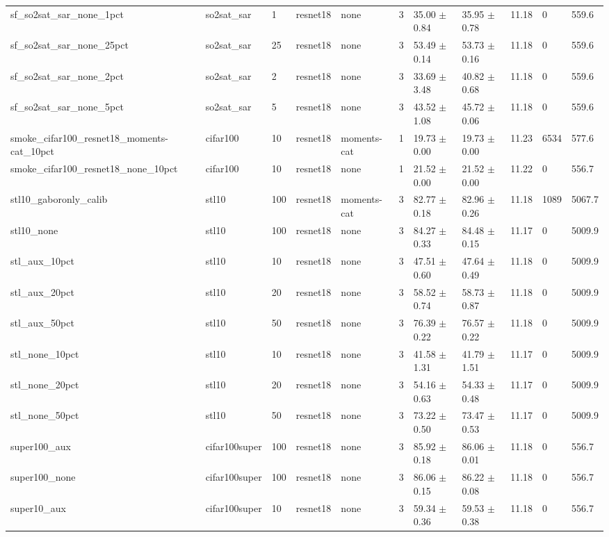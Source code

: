 \begin{tabular}{lllllllllll}
sf_so2sat_sar_none_1pct & so2sat_sar & 1 & resnet18 & none & 3 & 35.00 $\pm$ 0.84 & 35.95 $\pm$ 0.78 & 11.18 & 0 & 559.6 \\
sf_so2sat_sar_none_25pct & so2sat_sar & 25 & resnet18 & none & 3 & 53.49 $\pm$ 0.14 & 53.73 $\pm$ 0.16 & 11.18 & 0 & 559.6 \\
sf_so2sat_sar_none_2pct & so2sat_sar & 2 & resnet18 & none & 3 & 33.69 $\pm$ 3.48 & 40.82 $\pm$ 0.68 & 11.18 & 0 & 559.6 \\
sf_so2sat_sar_none_5pct & so2sat_sar & 5 & resnet18 & none & 3 & 43.52 $\pm$ 1.08 & 45.72 $\pm$ 0.06 & 11.18 & 0 & 559.6 \\
smoke_cifar100_resnet18_moments-cat_10pct & cifar100 & 10 & resnet18 & moments-cat & 1 & 19.73 $\pm$ 0.00 & 19.73 $\pm$ 0.00 & 11.23 & 6534 & 577.6 \\
smoke_cifar100_resnet18_none_10pct & cifar100 & 10 & resnet18 & none & 1 & 21.52 $\pm$ 0.00 & 21.52 $\pm$ 0.00 & 11.22 & 0 & 556.7 \\
stl10_gaboronly_calib & stl10 & 100 & resnet18 & moments-cat & 3 & 82.77 $\pm$ 0.18 & 82.96 $\pm$ 0.26 & 11.18 & 1089 & 5067.7 \\
stl10_none & stl10 & 100 & resnet18 & none & 3 & 84.27 $\pm$ 0.33 & 84.48 $\pm$ 0.15 & 11.17 & 0 & 5009.9 \\
stl_aux_10pct & stl10 & 10 & resnet18 & none & 3 & 47.51 $\pm$ 0.60 & 47.64 $\pm$ 0.49 & 11.18 & 0 & 5009.9 \\
stl_aux_20pct & stl10 & 20 & resnet18 & none & 3 & 58.52 $\pm$ 0.74 & 58.73 $\pm$ 0.87 & 11.18 & 0 & 5009.9 \\
stl_aux_50pct & stl10 & 50 & resnet18 & none & 3 & 76.39 $\pm$ 0.22 & 76.57 $\pm$ 0.22 & 11.18 & 0 & 5009.9 \\
stl_none_10pct & stl10 & 10 & resnet18 & none & 3 & 41.58 $\pm$ 1.31 & 41.79 $\pm$ 1.51 & 11.17 & 0 & 5009.9 \\
stl_none_20pct & stl10 & 20 & resnet18 & none & 3 & 54.16 $\pm$ 0.63 & 54.33 $\pm$ 0.48 & 11.17 & 0 & 5009.9 \\
stl_none_50pct & stl10 & 50 & resnet18 & none & 3 & 73.22 $\pm$ 0.50 & 73.47 $\pm$ 0.53 & 11.17 & 0 & 5009.9 \\
super100_aux & cifar100super & 100 & resnet18 & none & 3 & 85.92 $\pm$ 0.18 & 86.06 $\pm$ 0.01 & 11.18 & 0 & 556.7 \\
super100_none & cifar100super & 100 & resnet18 & none & 3 & 86.06 $\pm$ 0.15 & 86.22 $\pm$ 0.08 & 11.18 & 0 & 556.7 \\
super10_aux & cifar100super & 10 & resnet18 & none & 3 & 59.34 $\pm$ 0.36 & 59.53 $\pm$ 0.38 & 11.18 & 0 & 556.7 \\

\end{tabular}
